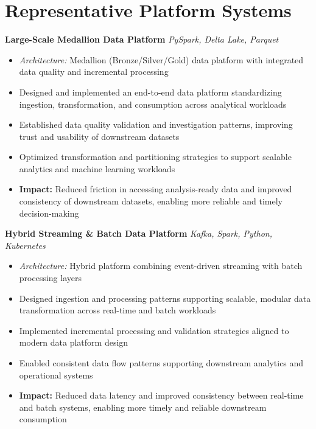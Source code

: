 \section{Representative Platform Systems}

\textbf{Large-Scale Medallion Data Platform} \hfill {\small\textit{PySpark, Delta Lake, Parquet}}
\begin{itemize}
	\item \textit{Architecture:} Medallion (Bronze/Silver/Gold) data platform with integrated data quality and incremental processing
	\item Designed and implemented an end-to-end data platform standardizing ingestion, transformation, and consumption across analytical workloads
	\item Established data quality validation and investigation patterns, improving trust and usability of downstream datasets
	\item Optimized transformation and partitioning strategies to support scalable analytics and machine learning workloads
	\item \textbf{Impact:} Reduced friction in accessing analysis-ready data and improved consistency of downstream datasets, enabling more reliable and timely decision-making
\end{itemize}

\textbf{Hybrid Streaming \& Batch Data Platform} \hfill {\small\textit{Kafka, Spark, Python, Kubernetes}}
\begin{itemize}
	\item \textit{Architecture:} Hybrid platform combining event-driven streaming with batch processing layers
	\item Designed ingestion and processing patterns supporting scalable, modular data transformation across real-time and batch workloads
	\item Implemented incremental processing and validation strategies aligned to modern data platform design
	\item Enabled consistent data flow patterns supporting downstream analytics and operational systems
	\item \textbf{Impact:} Reduced data latency and improved consistency between real-time and batch systems, enabling more timely and reliable downstream consumption
\end{itemize}

